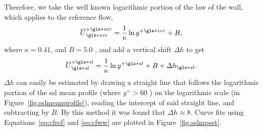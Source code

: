 Therefore, we take the well known logarithmic portion of the law of the wall, which applies to the reference flow,
\begin{equation} 
	\overline{U}\pz\zz=\frac{1}{\kappa}\ln y\pz+B\label{eq:cfref}
,\end{equation}
where $\kappa=0.41$, and  $B=5.0$ \cite{schlichting2016}, and add a vertical shift  $\Delta h$ to get
 \begin{equation}
	 \overline{U}\ps\ssl=\frac{1}{\kappa}\ln y\ps +B+\Delta h\ssl\label{eq:cfww}
.\end{equation}
$\Delta h$ can easily be estimated by drawing a straight line that follows the logarithmic portion of the \gls{ssl} mean profile (where $y^{+}>60$ ) on the logarithmic scale (in Figure~\ref{fig:sslmeanprofile}), reading the intercept of said straight line, and subtracting by $B$. By this method it was found that  $\Delta h\approx8$. Curve fits using Equations~\eqref{eq:cfref} and \eqref{eq:cfww} are plotted in Figure~\ref{fig:sslmpest}.

